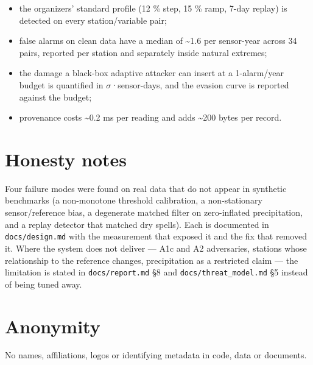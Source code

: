 \documentclass[10pt,a4paper]{article}
\begin{document}
\begin{itemize}
\item the organizers' standard profile (12 \% step, 15 \% ramp, 7-\allowbreak{}day replay) is
detected on every station/\allowbreak{}variable pair;

\item false alarms on clean data have a median of \textasciitilde{}1.6 per sensor-\allowbreak{}year across 34
pairs, reported per station and separately inside natural extremes;

\item the damage a black-\allowbreak{}box adaptive attacker can insert at a 1-\allowbreak{}alarm/\allowbreak{}year budget is
quantified in $\sigma$·sensor-\allowbreak{}days, and the evasion curve is reported against the budget;

\item provenance costs \textasciitilde{}0.2 ms per reading and adds \textasciitilde{}200 bytes per record.
\end{itemize}

\section*{Honesty notes}
Four failure modes were found on real data that do not appear in synthetic benchmarks (a non-\allowbreak{}monotone threshold calibration, a non-\allowbreak{}stationary sensor/\allowbreak{}reference bias, a degenerate matched filter on zero-\allowbreak{}inflated precipitation, and a replay detector that matched dry spells). Each is documented in \texttt{docs/\allowbreak{}design.md} with the measurement that exposed it and the fix that removed it. Where the system does not deliver — A1c and A2 adversaries, stations whose relationship to the reference changes, precipitation as a restricted claim — the limitation is stated in \texttt{docs/\allowbreak{}report.md} §8 and \texttt{docs/\allowbreak{}threat\_\allowbreak{}model.md} §5 instead of being tuned away.

\section*{Anonymity}
No names, affiliations, logos or identifying metadata in code, data or documents.
\end{document}
